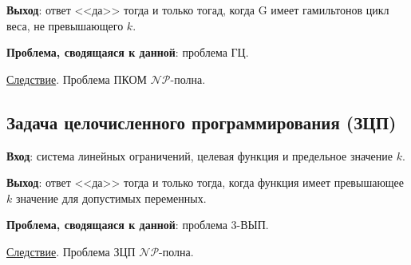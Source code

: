 \textbf{Выход}: ответ <<да>> тогда и только  тогад, когда G имеет гамильтонов цикл веса, не превышающего $k$.

\textbf{Проблема, сводящаяся к данной}: проблема ГЦ.

\underline{Следствие}. Проблема ПКОМ $\mathscr{NP}$-полна.

\subsection{Задача целочисленного программирования (ЗЦП)}
\textbf{Вход}: система линейных ограничений, целевая функция и предельное значение $k$.

\textbf{Выход}: ответ <<да>> тогда и только тогда, когда функция имеет превышающее $k$ значение для допустимых переменных.

\textbf{Проблема, сводящаяся к данной}: проблема 3-ВЫП.

\underline{Следствие}. Проблема ЗЦП $\mathscr{NP}$-полна.